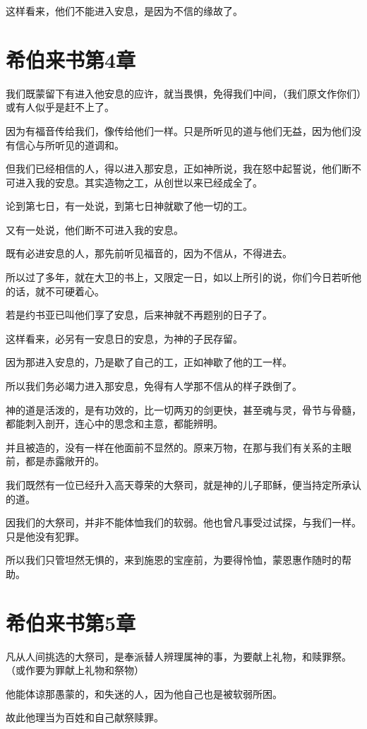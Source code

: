 \documentclass[12pt,oneside]{book}
\begin{document}
这样看来，他们不能进入安息，是因为不信的缘故了。

\chapter{希伯来书第4章}
我们既蒙留下有进入他安息的应许，就当畏惧，免得我们中间，（我们原文作你们）或有人似乎是赶不上了。

因为有福音传给我们，像传给他们一样。只是所听见的道与他们无益，因为他们没有信心与所听见的道调和。

但我们已经相信的人，得以进入那安息，正如神所说，我在怒中起誓说，他们断不可进入我的安息。其实造物之工，从创世以来已经成全了。

论到第七日，有一处说，到第七日神就歇了他一切的工。

又有一处说，他们断不可进入我的安息。

既有必进安息的人，那先前听见福音的，因为不信从，不得进去。

所以过了多年，就在大卫的书上，又限定一日，如以上所引的说，你们今日若听他的话，就不可硬着心。

若是约书亚已叫他们享了安息，后来神就不再题别的日子了。

这样看来，必另有一安息日的安息，为神的子民存留。

因为那进入安息的，乃是歇了自己的工，正如神歇了他的工一样。

所以我们务必竭力进入那安息，免得有人学那不信从的样子跌倒了。

神的道是活泼的，是有功效的，比一切两刃的剑更快，甚至魂与灵，骨节与骨髓，都能刺入剖开，连心中的思念和主意，都能辨明。

并且被造的，没有一样在他面前不显然的。原来万物，在那与我们有关系的主眼前，都是赤露敞开的。

我们既然有一位已经升入高天尊荣的大祭司，就是神的儿子耶稣，便当持定所承认的道。

因我们的大祭司，并非不能体恤我们的软弱。他也曾凡事受过试探，与我们一样。只是他没有犯罪。

所以我们只管坦然无惧的，来到施恩的宝座前，为要得怜恤，蒙恩惠作随时的帮助。

\chapter{希伯来书第5章}
凡从人间挑选的大祭司，是奉派替人辨理属神的事，为要献上礼物，和赎罪祭。（或作要为罪献上礼物和祭物）

他能体谅那愚蒙的，和失迷的人，因为他自己也是被软弱所困。

故此他理当为百姓和自己献祭赎罪。
\end{document}

